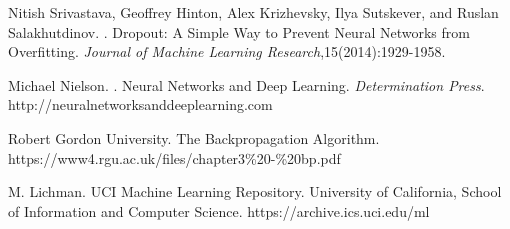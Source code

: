 \documentclass[11pt,letterpaper]{article}
\begin{document}
\begin{thebibliography}{}

Nitish Srivastava, Geoffrey Hinton, Alex Krizhevsky, Ilya Sutskever, and Ruslan Salakhutdinov.
.
\newblock Dropout: A Simple Way to Prevent Neural Networks from Overfitting. {\em Journal of Machine Learning Research},15(2014):1929-1958.

Michael Nielson.
.
\newblock Neural Networks and Deep Learning. {\em Determination Press}.
\newblock http://neuralnetworksanddeeplearning.com

Robert Gordon University.
\newblock The Backpropagation Algorithm.
\newblock https://www4.rgu.ac.uk/files/chapter3\%20-\%20bp.pdf

M. Lichman.
\newblock UCI Machine Learning Repository.
\newblock University of California, School of Information and Computer Science.
\newblock https://archive.ics.uci.edu/ml
\end{thebibliography}
\end{document}
